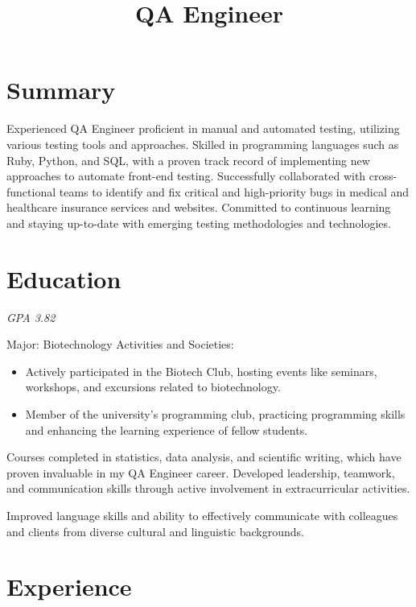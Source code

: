 \documentclass[11pt,a4paper,sans]{moderncv}
\title{QA Engineer}
\begin{document}
\makecvtitle

\section{Summary}
Experienced QA Engineer proficient in manual and automated testing, utilizing various testing tools and approaches. Skilled in programming languages such as Ruby, Python, and SQL, with a proven track record of implementing new approaches to automate front-end testing. Successfully collaborated with cross-functional teams to identify and fix critical and high-priority bugs in medical and healthcare insurance services and websites. Committed to continuous learning and staying up-to-date with emerging testing methodologies and technologies.

\section{Education}
{\textit{GPA 3.82}}
{Major: Biotechnology\newline{}
Activities and Societies:
\begin{itemize}
\item Actively participated in the Biotech Club, hosting events like seminars, workshops, and excursions related to biotechnology.
\item Member of the university's programming club, practicing programming skills and enhancing the learning experience of fellow students.
\end{itemize}
Courses completed in statistics, data analysis, and scientific writing, which have proven invaluable in my QA Engineer career. Developed leadership, teamwork, and communication skills through active involvement in extracurricular activities.}

{Improved language skills and ability to effectively communicate with colleagues and clients from diverse cultural and linguistic backgrounds.}


\section{Experience}
\end{document}
